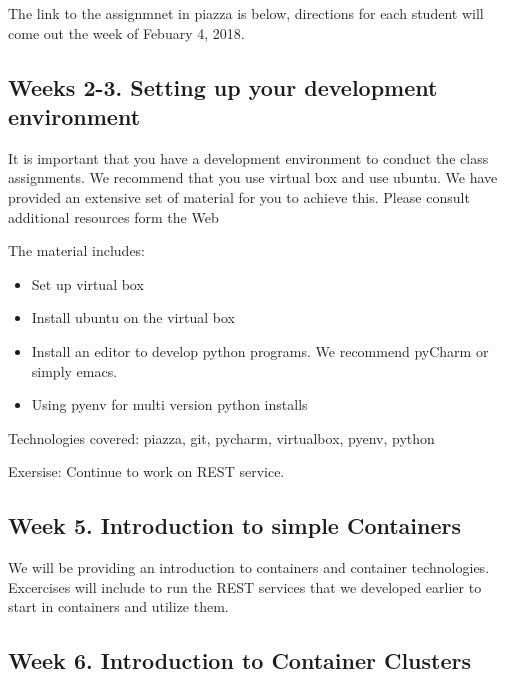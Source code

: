 
The link to the assignmnet in piazza is below, directions for each student will come out the week of Febuary 4, 2018. 


\subsection{Weeks 2-3. Setting up your development environment}

It is important that you have a development environment to conduct the
class assignments. We recommend that you use virtual box and use
ubuntu. We have provided an extensive set of material for you to
achieve this. Please consult additional resources form the Web

The material includes:


\begin{itemize}

\item Set up virtual box

\item Install ubuntu on the virtual box

\item Install an editor to develop python programs. We recommend
  pyCharm or simply emacs.

\item Using pyenv for multi version python installs

\end{itemize}

Technologies covered:	piazza,	git,	pycharm,	virtualbox,	pyenv,	python

Exersise: Continue to work on REST service.

\subsection{Week 5. Introduction to simple Containers}

We will be providing an introduction to containers and container
technologies. Excercises will include to run the REST services that we
developed earlier to start in containers and utilize them.

\subsection{Week 6. Introduction to Container Clusters}

